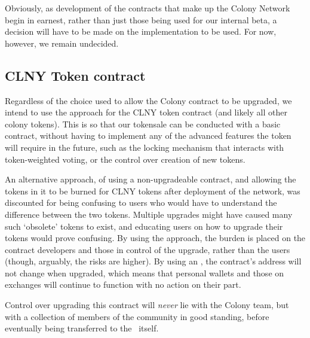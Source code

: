 Obviously, as development of the contracts that make up the Colony Network begin in earnest, rather than just those being used for our internal beta, a decision will have to be made on the implementation to be used. For now, however, we remain undecided.

\subsection{CLNY Token contract}\label{app:clnyupgrade}
Regardless of the choice used to allow the Colony contract to be upgraded, we intend to use the  approach for the CLNY token contract (and likely all other colony tokens). This is so that our tokensale can be conducted with a basic contract, without having to implement any of the advanced features the token will require in the future, such as the locking mechanism that interacts with token-weighted voting, or the control over creation of new tokens.

An alternative approach, of using a non-upgradeable contract, and allowing the tokens in it to be burned for CLNY tokens after deployment of the network, was discounted for being confusing to users who would have to understand the difference between the two tokens. Multiple upgrades might have caused many such `obsolete' tokens to exist, and educating users on how to upgrade their tokens would prove confusing. By using the  approach, the burden is placed on the contract developers and those in control of the upgrade, rather than the users (though, arguably, the risks are higher). By using an , the contract's address will not change when upgraded, which means that personal wallets and those on exchanges will continue to function with no action on their part.

Control over upgrading this contract will \emph{never} lie with the Colony team, but with a collection of members of the community in good standing, before eventually being transferred to the \rc\ itself. 